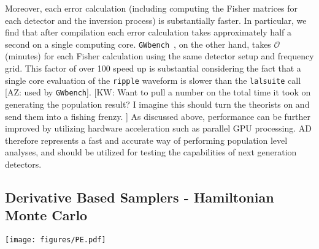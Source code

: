 \documentclass[twocolumn]{aastex631}
\newcommand{\ripple}{\texttt{ripple}\xspace}
\newcommand{\lalsuite}{\texttt{lalsuite}\xspace}
\newcommand{\kw}[1]{{\color{rb4}[KW: #1 ]}}
\newcommand{\AZ}[1]{{\color{Burnt}[AZ: #1]}}
\newcommand{\amc}[1]{{\color{red}[AC: #1]}}
\begin{document}
Moreover, each error calculation (including computing the Fisher matrices for each detector and the inversion process) is substantially faster.
In particular, we find that after compilation each error calculation takes approximately half a second on a single computing core.
\texttt{GWbench}~\citep{Borhanian:2020ypi}, on the other hand, takes $\mathcal{O}$(minutes) for each Fisher calculation using the same detector setup and frequency grid.
This factor of over 100 speed up is substantial considering the fact that a single core evaluation of the \ripple waveform is slower than the \lalsuite call \AZ{used by \texttt{GWbench}}.
\kw{Want to pull a number on the total time it took on generating the population result? I imagine this should turn the theorists on and send them into a fishing frenzy.}
As discussed above, performance can be further improved by utilizing hardware acceleration such as parallel GPU processing.
AD therefore represents a fast and accurate way of performing population level analyses, and should be utilized for testing the capabilities of next generation detectors.

\subsection{Derivative Based Samplers - Hamiltonian Monte Carlo}
\label{subsec:hmc}

\begin{figure*}[t]
    \centering
    \texttt{[image: figures/PE.pdf]}
    \caption{
        Corner plot for the posteriors from an HMC (see text for details) on simulated noise with injected signal. 
        Orange lines indicate the true values of the injection. 
        Although not fully converged, it is clear that we find posteriors consistent with the injected parameters. \amc{could apply a mild Gaussian kernel to smooth this for the sake of presentation. Are the parameter ranges due to your priors? How did you handle the boundaries in the HMC?}
    }
    \label{fig:corner}
\end{figure*}
\end{document}

